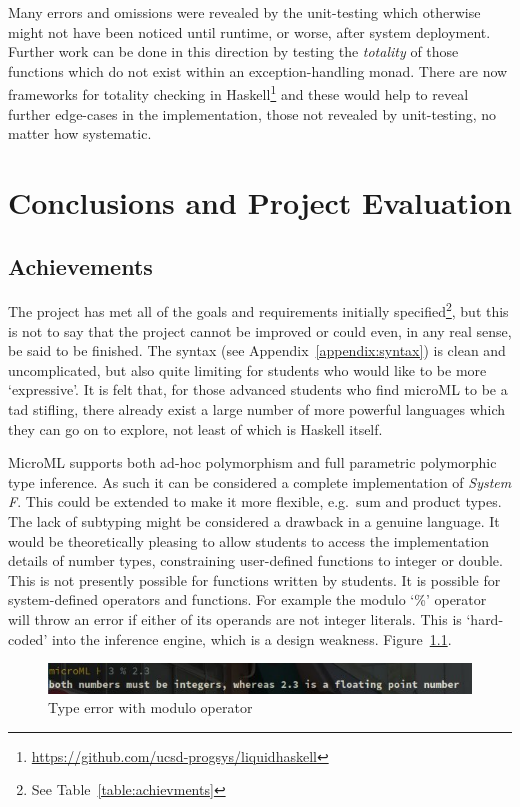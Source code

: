 \documentclass[12pt, a4paper]{report}
\begin{document}
Many errors and omissions were revealed by the unit-testing which otherwise might not have
been noticed until runtime, or worse, after system deployment. Further work can be done
in this direction by testing the \textit{totality} of those functions which do not exist
within an exception-handling monad. There are now frameworks for totality checking in
Haskell\footnote{\url{https://github.com/ucsd-progsys/liquidhaskell}} and these would help to reveal
further edge-cases in the implementation, those not revealed by unit-testing, no matter how
systematic.

\chapter{Conclusions and Project Evaluation}

\section{Achievements}
The project has met all of the goals and requirements initially specified\footnote{See
Table~\ref{table:achievments}}, but this is not to say
that the project cannot be improved or could even, in any real sense, be said to be finished. The
syntax (see Appendix~\ref{appendix:syntax}) is clean and uncomplicated, but also quite limiting for
students who would like to be more `expressive'. It is felt that, for those advanced students who
find microML to be a tad stifling, there already exist a large number of more powerful languages
which they can go on to explore, not least of which is Haskell itself. 

MicroML supports both ad-hoc polymorphism and full parametric polymorphic type inference. As such
it can be considered a complete implementation of \textit{System F}. This could be extended to
make it more flexible, e.g.\ sum and product types. The lack of subtyping might be considered a
drawback in a genuine language. It would be theoretically pleasing to allow students to access the
implementation details of number types, constraining user-defined functions to integer or double.
This is not presently possible for functions written by students. It is possible for
system-defined operators and functions. For example the modulo `\%' operator will throw an error
if either of its operands are not integer literals. This is `hard-coded' into the inference engine,
which is a design weakness. Figure~\ref{fig:modulo}.

\begin{figure}
    \includegraphics[width=\textwidth]{images/modulo.jpg}
    \caption{Type error with modulo operator}
\label{fig:modulo}
\end{figure}
\end{document}
